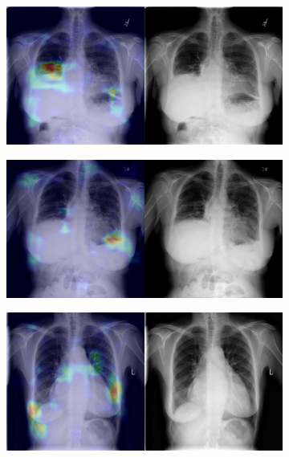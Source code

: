 \begin{figure}[b]
\begin{subfigure}{0.4\textwidth}
    \end{subfigure}
    \begin{subfigure}{0.4\textwidth}
        \centering
        \includegraphics[width=1.0\textwidth]{Chapters/5. Conclusiones/img/Effusion/1_1_00000181_054.png}
    \end{subfigure}
    \begin{subfigure}{0.4\textwidth}
        \centering
        \includegraphics[width=1.0\textwidth]{Chapters/5. Conclusiones/img/Effusion/1_1_00000181_055.png}
    \end{subfigure}
    \begin{subfigure}{0.4\textwidth}
        \centering
        \includegraphics[width=1.0\textwidth]{Chapters/5. Conclusiones/img/Effusion/1_1_00000211_004.png}

\end{subfigure}
\end{figure}
